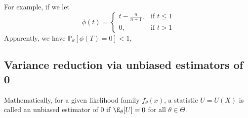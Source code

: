 For example, if we let
\[
    \phi(t) = \begin{cases} t - \frac{n}{n+1}, & \text{if } t \leq 1 \\
              0,                 & \text{if } t > 1
    \end{cases}
\]
Apparently, we have $\mathbb{P}_\theta[\phi(T)=0] < 1$,

\subsection{Variance reduction via unbiased estimators of 0}
Mathematically, for a given likelihood family $f_\theta(x)$, a statistic $U=U(X)$ is called an
unbiased estimator of 0 if $\E_\theta[U]=0$ for all $\theta \in \Theta$.